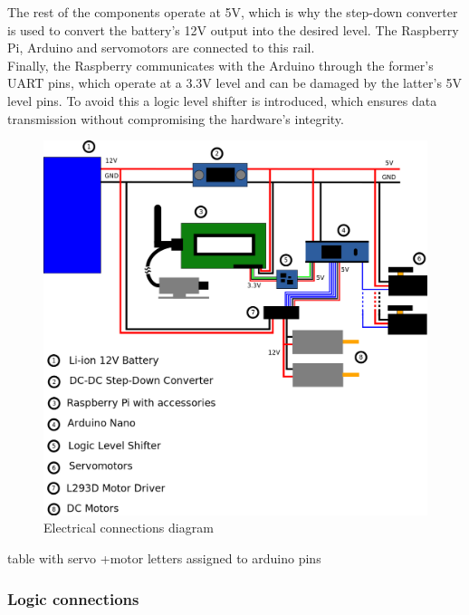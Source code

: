 The rest of the components operate at 5V, which is why the step-down converter is used to convert the battery's 12V output into the desired level. The Raspberry Pi, Arduino and servomotors are connected to this rail.\\

Finally, the Raspberry communicates with the Arduino through the former's UART pins, which operate at a 3.3V level and can be damaged by the latter's 5V level pins. To avoid this a logic level shifter is introduced, which ensures data transmission without compromising the hardware's integrity.\\

	\begin{figure}[H]
			\centering
			\includegraphics[width=15cm, angle=0]{images/Diagrams/electrical.png}
			\caption{Electrical connections diagram }
			\label{electricDiagram}
	\end{figure}
	\bigskip
	
	

table with servo +motor letters assigned to arduino pins
	


\subsubsection{Logic connections}

